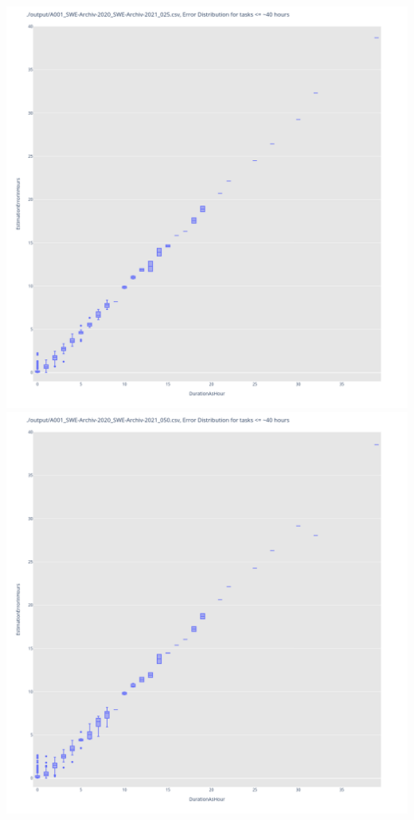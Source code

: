 \includegraphics[width=\textwidth]{Scripts/output/A001_SWE-Archiv-2020_SWE-Archiv-2021_025.csv.error_distribution.png}
\includegraphics[width=\textwidth]{Scripts/output/A001_SWE-Archiv-2020_SWE-Archiv-2021_050.csv.error_distribution.png}
